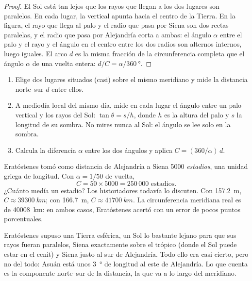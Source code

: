 \begin{proof}
El Sol está tan lejos que los rayos que llegan a los dos lugares son
paralelos. En cada lugar, la vertical apunta hacia el centro de la Tierra. En
la figura, el rayo que llega al palo y el radio que pasa por Siena son dos
rectas paralelas, y el radio que pasa por Alejandría corta a ambas: el ángulo
$\alpha$ entre el palo y el rayo y el ángulo en el centro entre los dos
radios son alternos internos, luego iguales. El arco $d$ es la misma fracción
de la circunferencia completa que el ángulo $\alpha$ de una vuelta entera:
$d/C = \alpha/\qty{360}{\degree}$.
\end{proof}

\begin{method}\label{met:g10:measuring-the-earth:shadows}
\begin{enumerate}
  \item Elige dos lugares situados (casi) sobre el mismo meridiano y mide la
        distancia norte--sur $d$ entre ellos.
  \item A mediodía local del mismo día, mide en cada lugar el ángulo entre
        un palo vertical y los rayos del Sol: $\tan \theta = s/h$, donde $h$
        es la altura del palo y $s$ la longitud de su sombra. No mires nunca
        al Sol: el ángulo se lee solo en la sombra.
  \item Calcula la diferencia $\alpha$ entre los dos ángulos y aplica
        $C = (360/\alpha)\,d$.
\end{enumerate}
\end{method}

\begin{example}\label{ex:g10:measuring-the-earth:numbers}
Eratóstenes tomó como distancia de Alejandría a Siena 5000
\emph{estadios}, una unidad griega de longitud. Con $\alpha = 1/50$ de vuelta,
\[
  C = 50 \times 5000 = 250\,000 \text{ estadios}.
\]
¿Cuánto medía un estadio? Los historiadores todavía lo discuten. Con
\qty{157.2}{m}, $C \approx \qty{39300}{km}$; con \qty{166.7}{m},
$C \approx \qty{41700}{km}$. La circunferencia meridiana real es de
\qty{40008}{km}: en ambos casos, Eratóstenes acertó con un error de pocos
puntos porcentuales.
\end{example}

\begin{remark}\label{rem:g10:measuring-the-earth:assumptions}
Eratóstenes supuso una Tierra esférica, un Sol lo bastante lejano para que
sus rayos fueran paralelos, Siena exactamente sobre el trópico (donde el Sol
puede estar en el cenit) y Siena justo al sur de Alejandría. Todo ello era
casi cierto, pero no del todo: Asuán está unos \qty{3}{\degree} de longitud
al este de Alejandría. Lo que cuenta es la componente norte--sur de la
distancia, la que va a lo largo del meridiano.
\end{remark}

